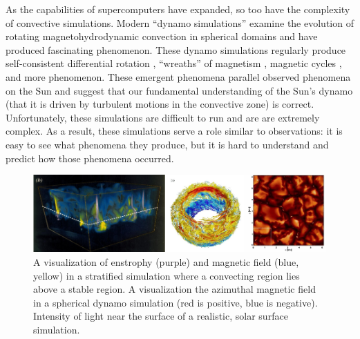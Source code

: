 As the capabilities of supercomputers have expanded, so too have the complexity of convective simulations.
Modern ``dynamo simulations'' examine the evolution of rotating magnetohydrodynamic convection in spherical domains and have produced fascinating phenomenon.
These dynamo simulations regularly produce self-consistent differential rotation \citep{strugarek&all2018}, ``wreaths'' of magnetism \citep[][and visualized in the middle panel of Fig.~\ref{fig:complex_simulations}]{brown&all2010, brown&all2011}, magnetic cycles \citep{brown&all2011}, and more phenomenon.
These emergent phenomena parallel observed phenomena on the Sun and suggest that our fundamental understanding of the Sun's dynamo (that it is driven by turbulent motions in the convective zone) is correct.
Unfortunately, these simulations are difficult to run and are are extremely complex.
As a result, these simulations serve a role similar to observations: it is easy to see what phenomena they produce, but it is hard to understand and predict how those phenomena occurred.

\begin{figure}[t!]
\vspace{0.25cm}
\includegraphics[width=\textwidth]{./figs/intro/complex_simulations.pdf}
\caption[Visualizations of modern simulations of astrophysical convection.]
{
	\citep[left, Fig.~2b of][]{tobias&all1998} A visualization of enstrophy (purple) and magnetic field (blue, yellow) in a stratified simulation where a convecting region lies above a stable region.
	\citep[middle, Fig.~2a of][]{brown&all2011} A visualization the azimuthal magnetic field in a spherical dynamo simulation (red is positive, blue is negative).
	\citep[right, Fig.~6a of][]{rempel2014} Intensity of light near the surface of a realistic, solar surface simulation.
	\label{fig:complex_simulations} 
}
\end{figure}



